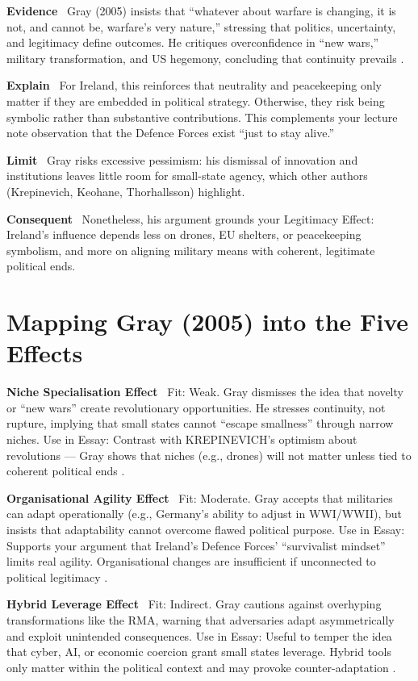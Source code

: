 \textbf{Evidence} \
Gray (2005) insists that “whatever about warfare is changing, it is not, and cannot be, warfare’s very nature,” stressing that politics, uncertainty, and legitimacy define outcomes. He critiques overconfidence in “new wars,” military transformation, and US hegemony, concluding that continuity prevails \parencite{GRAY_2005}.

\textbf{Explain} \
For Ireland, this reinforces that neutrality and peacekeeping only matter if they are embedded in political strategy. Otherwise, they risk being symbolic rather than substantive contributions. This complements your lecture note observation that the Defence Forces exist “just to stay alive.”

\textbf{Limit} \
Gray risks excessive pessimism: his dismissal of innovation and institutions leaves little room for small-state agency, which other authors (Krepinevich, Keohane, Thorhallsson) highlight.

\textbf{Consequent} \
Nonetheless, his argument grounds your Legitimacy Effect: Ireland’s influence depends less on drones, EU shelters, or peacekeeping symbolism, and more on aligning military means with coherent, legitimate political ends.

\section*{Mapping Gray (2005) into the Five Effects}

\textbf{Niche Specialisation Effect} \
Fit: Weak. Gray dismisses the idea that novelty or “new wars” create revolutionary opportunities. He stresses continuity, not rupture, implying that small states cannot “escape smallness” through narrow niches.
Use in Essay: Contrast with KREPINEVICH’s optimism about revolutions — Gray shows that niches (e.g., drones) will not matter unless tied to coherent political ends \parencite{GRAY_2005}.

\textbf{Organisational Agility Effect} \
Fit: Moderate. Gray accepts that militaries can adapt operationally (e.g., Germany’s ability to adjust in WWI/WWII), but insists that adaptability cannot overcome flawed political purpose.
Use in Essay: Supports your argument that Ireland’s Defence Forces’ “survivalist mindset” limits real agility. Organisational changes are insufficient if unconnected to political legitimacy \parencite{GRAY_2005}.

\textbf{Hybrid Leverage Effect} \
Fit: Indirect. Gray cautions against overhyping transformations like the RMA, warning that adversaries adapt asymmetrically and exploit unintended consequences.
Use in Essay: Useful to temper the idea that cyber, AI, or economic coercion grant small states leverage. Hybrid tools only matter within the political context and may provoke counter-adaptation \parencite{GRAY_2005}.

